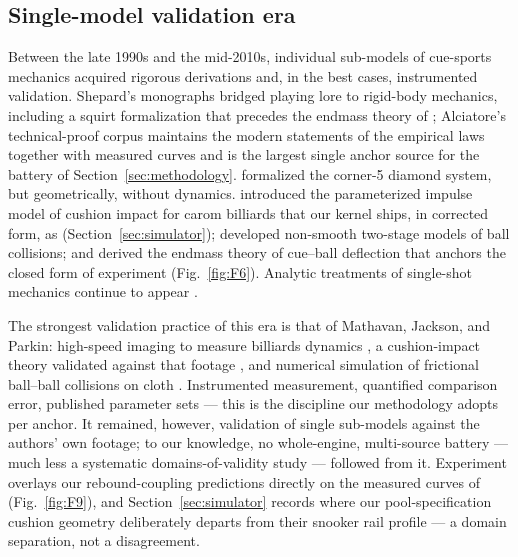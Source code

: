 \subsection{Single-model validation era}

Between the late 1990s and the mid-2010s, individual sub-models of
cue-sports mechanics acquired rigorous derivations and, in the best cases,
instrumented validation. Shepard's monographs
\citep{shepard1997amateur,shepard2001squirt} bridged playing lore to
rigid-body mechanics, including a squirt formalization that precedes the
endmass theory of \citet{cross2008squirt}; Alciatore's technical-proof
corpus \citep{alciatore2008coriolis,alciatore_tp_catalog} maintains the
modern statements of the empirical laws together with measured curves and
is the largest single anchor source for the battery of
Section~\ref{sec:methodology}. \citet{cohen2002threecushion} formalized
the corner-5 diamond system, but geometrically, without dynamics.
\citet{han2005dynamics} introduced the parameterized impulse model of
cushion impact for carom billiards that our kernel ships, in corrected
form, as  (Section~\ref{sec:simulator});
\citet{domenech2008nonsmooth} developed non-smooth two-stage models of
ball collisions; and \citet{cross2008squirt} derived the endmass theory of
cue--ball deflection that anchors the closed form of experiment 
(Fig.~\ref{fig:F6}). Analytic treatments of single-shot mechanics continue
to appear \citep{kim2022motions,kim2024collision}.

The strongest validation practice of this era is that of Mathavan,
Jackson, and Parkin: high-speed imaging to measure billiards dynamics
\citep{mathavan2009highspeed}, a cushion-impact theory validated against
that footage \citep{mathavan2010cushion}, and numerical simulation of
frictional ball--ball collisions on cloth \citep{mathavan2014numerical}.
Instrumented measurement, quantified comparison error, published parameter
sets --- this is the discipline our methodology adopts per anchor. It
remained, however, validation of single sub-models against the authors'
own footage; to our knowledge, no whole-engine, multi-source battery ---
much less a systematic domains-of-validity study --- followed from it.
Experiment  overlays our rebound-coupling predictions directly
on the measured curves of \citet[Figs.~7--10]{mathavan2010cushion}
(Fig.~\ref{fig:F9}), and Section~\ref{sec:simulator} records where our
pool-specification cushion geometry deliberately departs from their
snooker rail profile --- a domain separation, not a disagreement.

